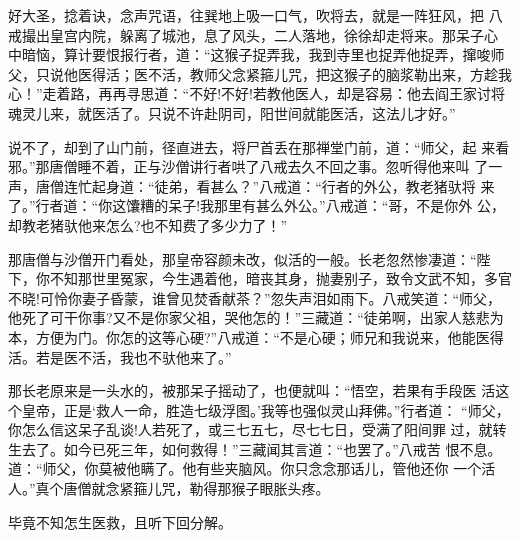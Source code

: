 好大圣，捻着诀，念声咒语，往巽地上吸一口气，吹将去，就是一阵狂风，把
八戒撮出皇宫内院，躲离了城池，息了风头，二人落地，徐徐却走将来。那呆子心
中暗恼，算计要恨报行者，道：“这猴子捉弄我，我到寺里也捉弄他捉弄，撺唆师
父，只说他医得活；医不活，教师父念紧箍儿咒，把这猴子的脑浆勒出来，方趁我
心！”走着路，再再寻思道：“不好!不好!若教他医人，却是容易：他去阎王家讨将
魂灵儿来，就医活了。只说不许赴阴司，阳世间就能医活，这法儿才好。”

说不了，却到了山门前，径直进去，将尸首丢在那禅堂门前，道：“师父，起
来看邪。”那唐僧睡不着，正与沙僧讲行者哄了八戒去久不回之事。忽听得他来叫
了一声，唐僧连忙起身道：“徒弟，看甚么？”八戒道：“行者的外公，教老猪驮将
来了。”行者道：“你这馕糟的呆子!我那里有甚么外公。”八戒道：“哥，不是你外
公，却教老猪驮他来怎么?也不知费了多少力了！”

那唐僧与沙僧开门看处，那皇帝容颜未改，似活的一般。长老忽然惨凄道：“陛
下，你不知那世里冤家，今生遇着他，暗丧其身，抛妻别子，致令文武不知，多官
不晓!可怜你妻子昏蒙，谁曾见焚香献茶？”忽失声泪如雨下。八戒笑道：“师父，
他死了可干你事?又不是你家父祖，哭他怎的！”三藏道：“徒弟啊，出家人慈悲为
本，方便为门。你怎的这等心硬?”八戒道：“不是心硬；师兄和我说来，他能医得
活。若是医不活，我也不驮他来了。”

那长老原来是一头水的，被那呆子摇动了，也便就叫：“悟空，若果有手段医
活这个皇帝，正是‘救人一命，胜造七级浮图。’我等也强似灵山拜佛。”行者道：
“师父，你怎么信这呆子乱谈!人若死了，或三七五七，尽七七日，受满了阳间罪
过，就转生去了。如今已死三年，如何救得！”三藏闻其言道：“也罢了。”八戒苦
恨不息。道：“师父，你莫被他瞒了。他有些夹脑风。你只念念那话儿，管他还你
一个活人。”真个唐僧就念紧箍儿咒，勒得那猴子眼胀头疼。

毕竟不知怎生医救，且听下回分解。